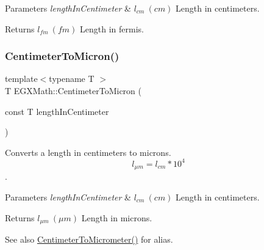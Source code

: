 \begin{DoxyParams}{Parameters}
{\em length\+In\+Centimeter} & $ l_{cm}\ (cm)$ Length in centimeters. \\
\hline
\end{DoxyParams}
\begin{DoxyReturn}{Returns}
$ l_{fm}\ (fm)$ Length in fermis. 
\end{DoxyReturn}
\mbox{\label{group___e_g_x_math-_conversions-_length_conversions-_s_i-_centimeter-_non-_s_i_gaee509ac676e86ed54994792f82dab9f7}} 
\subsubsection{\texorpdfstring{Centimeter\+To\+Micron()}{CentimeterToMicron()}}
{\footnotesize\ttfamily template$<$typename T $>$ \\
T E\+G\+X\+Math\+::\+Centimeter\+To\+Micron (\begin{DoxyParamCaption}\item[{const T}]{length\+In\+Centimeter }\end{DoxyParamCaption})}



Converts a length in centimeters to microns. \[ l_{\mu m}=l_{cm} * 10^{4} \]. 


\begin{DoxyParams}{Parameters}
{\em length\+In\+Centimeter} & $ l_{cm}\ (cm)$ Length in centimeters. \\
\hline
\end{DoxyParams}
\begin{DoxyReturn}{Returns}
$ l_{\mu m}\ (\mu m)$ Length in microns. 
\end{DoxyReturn}
\begin{DoxySeeAlso}{See also}
\mbox{\hyperlink{group___e_g_x_math-_conversions-_length_conversions-_s_i-_centimeter-_s_i_gaa05fd2c1b2c9ab2ac8aa7f1ef8be612a}{Centimeter\+To\+Micrometer()}} for alias. 
\end{DoxySeeAlso}
\mbox{\label{group___e_g_x_math-_conversions-_length_conversions-_s_i-_centimeter-_non-_s_i_ga4e94aa6f1cc6aaeb751384a8472b01fd}} 
